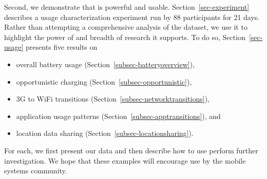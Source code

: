 


Second, we demonstrate that \PhoneLab{} is powerful and usable.
Section~\ref{sec-experiment} describes a usage characterization experiment
run by 88 \PhoneLab{} participants for 21 days. Rather than attempting a
comprehensive analysis of the dataset, we use it to highlight the power of
\PhoneLab{} and breadth of research it supports. To do so,
Section~\ref{sec-usage} presents five results on

\begin{itemize}[nosep]
\vspace*{0.08in}
\item overall battery usage (Section~\ref{subsec-batteryoverview}),
\item opportunistic charging (Section~\ref{subsec-opportunistic}),
\item 3G to WiFi transitions (Section~\ref{subsec-networktransitions}),
\item application usage patterns (Section~\ref{subsec-apptransitions}), and
\item location data sharing (Section~\ref{subsec-locationsharing}).
\vspace*{0.08in}
\end{itemize}

For each, we first present our data and then describe how to use \PhoneLab{}
perform further investigation. We hope that these examples will encourage
\PhoneLab{} use by the mobile systems community.
